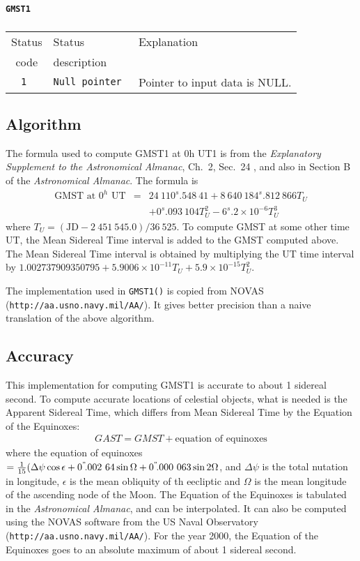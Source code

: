 \paragraph{\texttt{GMST1}}

\subparagraph{}

\begin{tabular}{|c|l|l|}
  \hline
  Status & Status       & Explanation \\
  code   & description  &             \\
  \hline
  \tt 1  & \tt Null pointer & Pointer to input data is NULL. \\
  \hline
\end{tabular}

\subsection{Algorithm}

The formula used to compute GMST1 at 0h UT1 is from the \textit{Explanatory
Supplement to the Astronomical Almanac}, Ch.~2, Sec.~24 \cite{esaa:1992},
and also in Section B of the \textit{Astronomical Almanac}.  The formula is
%
\begin{eqnarray*}
    {\text{GMST at $0^{h}$ UT}} & = & 24\ 110^{s}\!.548\ 41 + 8\ 640\ 184^{s}\!.812\ 866 T_{U} \\
 & & + 0^{s}\!.093\ 104 T_{U}^{2} - 6^{s}\!.2\times10^{-6} T_{U}^{3}
\end{eqnarray*}
%
where $T_{U} = (\mathrm{JD} - 2\ 451\ 545.0)/36\ 525$.  To compute GMST at
some other time UT, the Mean Sidereal Time interval is added to the GMST
computed above.  The Mean Sidereal Time interval is obtained by multiplying
the UT time interval by $1.002737909350795 + 5.9006\times10^{-11}T_{U} +
5.9\times10^{-15}T_{U}^{2}$.

The implementation used in \texttt{GMST1()} is copied from NOVAS
(\texttt{http://aa.usno.navy.mil/AA/}).  It gives better precision than a
naive translation of the above algorithm.

\subsection{Accuracy}
This implementation for computing GMST1 is accurate to about 1 sidereal
second.  To compute accurate locations of celestial objects, what is needed
is the Apparent Sidereal Time, which differs from Mean Sidereal Time by the
Equation of the Equinoxes:
%
\begin{eqnarray*}
  GAST = GMST + \textrm{equation of equinoxes}
\end{eqnarray*}
%
where the equation of equinoxes $= \frac{1}{15}(\Delta\psi \cos\epsilon +
0^{"}\!.002\ 64 \sin\Omega + 0^{"}\!.000\ 063 \sin
2\Omega$, and $\Delta\psi$ is the total nutation in longitude, $\epsilon$
is the mean obliquity of th eecliptic and $\Omega$ is the mean longitude of
the ascending node of the Moon.  The Equation of the Equinoxes is tabulated
in the \textit{Astronomical Almanac}, and can be interpolated.  It can also
be computed using the NOVAS software from the US Naval Observatory
(\texttt{http://aa.usno.navy.mil/AA/}). For the year 2000, the Equation of
the Equinoxes goes to an absolute maximum of about 1 sidereal second.

